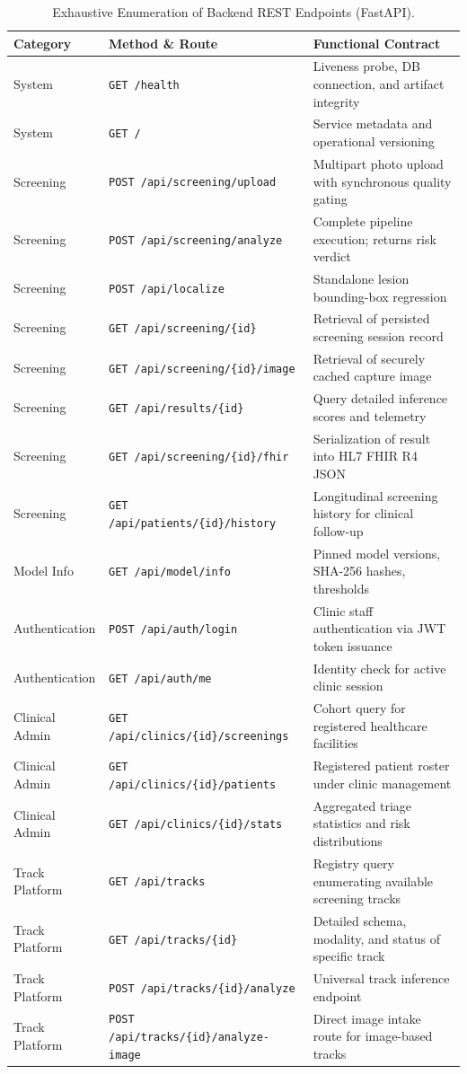 \documentclass[11pt,a4paper]{report}
\begin{document}
\begin{table}[H]
\centering
\scriptsize
\begin{tabularx}{\textwidth}{llX}
\toprule
\textbf{Category} & \textbf{Method \& Route} & \textbf{Functional Contract} \\
\midrule
System & \texttt{GET /health} & Liveness probe, DB connection, and artifact integrity \\
System & \texttt{GET /} & Service metadata and operational versioning \\
Screening & \texttt{POST /api/screening/upload} & Multipart photo upload with synchronous quality gating \\
Screening & \texttt{POST /api/screening/analyze} & Complete pipeline execution; returns risk verdict \\
Screening & \texttt{POST /api/localize} & Standalone lesion bounding-box regression \\
Screening & \texttt{GET /api/screening/\{id\}} & Retrieval of persisted screening session record \\
Screening & \texttt{GET /api/screening/\{id\}/image} & Retrieval of securely cached capture image \\
Screening & \texttt{GET /api/results/\{id\}} & Query detailed inference scores and telemetry \\
Screening & \texttt{GET /api/screening/\{id\}/fhir} & Serialization of result into HL7 FHIR R4 JSON \\
Screening & \texttt{GET /api/patients/\{id\}/history} & Longitudinal screening history for clinical follow-up \\
Model Info & \texttt{GET /api/model/info} & Pinned model versions, SHA-256 hashes, thresholds \\
Authentication & \texttt{POST /api/auth/login} & Clinic staff authentication via JWT token issuance \\
Authentication & \texttt{GET /api/auth/me} & Identity check for active clinic session \\
Clinical Admin & \texttt{GET /api/clinics/\{id\}/screenings}& Cohort query for registered healthcare facilities \\
Clinical Admin & \texttt{GET /api/clinics/\{id\}/patients}  & Registered patient roster under clinic management \\
Clinical Admin & \texttt{GET /api/clinics/\{id\}/stats}     & Aggregated triage statistics and risk distributions \\
Track Platform & \texttt{GET /api/tracks} & Registry query enumerating available screening tracks \\
Track Platform & \texttt{GET /api/tracks/\{id\}} & Detailed schema, modality, and status of specific track \\
Track Platform & \texttt{POST /api/tracks/\{id\}/analyze} & Universal track inference endpoint \\
Track Platform & \texttt{POST /api/tracks/\{id\}/analyze-image} & Direct image intake route for image-based tracks \\
\bottomrule
\end{tabularx}
\caption{Exhaustive Enumeration of Backend REST Endpoints (FastAPI).}
\label{tab:api_endpoints}
\end{table}
\end{document}
